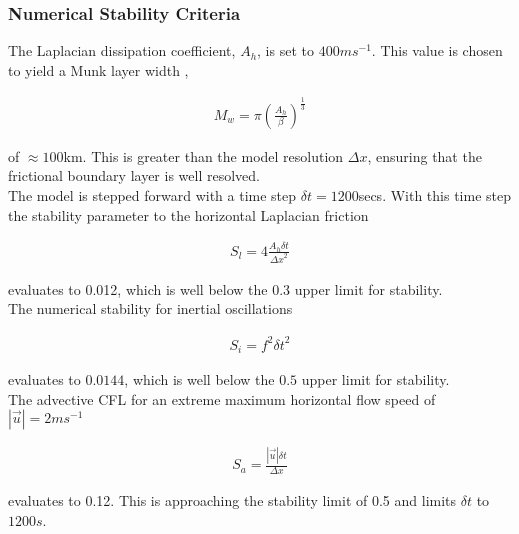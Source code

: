 \subsubsection{Numerical Stability Criteria}
\label{www:tutorials}

The Laplacian dissipation coefficient, $A_{h}$, is set to $400 m s^{-1}$.
This value is chosen to yield a Munk layer width \cite{adcroft:95},

\begin{eqnarray}
\label{EQ:eg-baro-munk_layer}
M_{w} = \pi ( \frac { A_{h} }{ \beta } )^{\frac{1}{3}}
\end{eqnarray}

\noindent  of $\approx 100$km. This is greater than the model
resolution $\Delta x$, ensuring that the frictional boundary
layer is well resolved.
\\

\noindent The model is stepped forward with a 
time step $\delta t=1200$secs. With this time step the stability 
parameter to the horizontal Laplacian friction \cite{adcroft:95}



\begin{eqnarray}
\label{EQ:eg-baro-laplacian_stability}
S_{l} = 4 \frac{A_{h} \delta t}{{\Delta x}^2}
\end{eqnarray}

\noindent evaluates to 0.012, which is well below the 0.3 upper limit
for stability. 
\\

\noindent The numerical stability for inertial oscillations  
\cite{adcroft:95} 

\begin{eqnarray}
\label{EQ:eg-baro-inertial_stability}
S_{i} = f^{2} {\delta t}^2
\end{eqnarray}

\noindent evaluates to $0.0144$, which is well below the $0.5$ upper 
limit for stability.
\\

\noindent The advective CFL \cite{adcroft:95} for an extreme maximum 
horizontal flow speed of $ | \vec{u} | = 2 ms^{-1}$

\begin{eqnarray}
\label{EQ:eg-baro-cfl_stability}
S_{a} = \frac{| \vec{u} | \delta t}{ \Delta x}
\end{eqnarray}

\noindent evaluates to 0.12. This is approaching the stability limit
of 0.5 and limits $\delta t$ to $1200s$.

